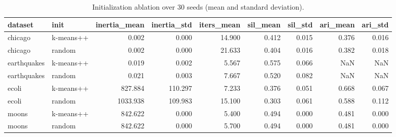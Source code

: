 \begin{table}[t]
\caption{Initialization ablation over 30 seeds (mean and standard deviation).}
\label{tab:init}
\begin{tabular}{llrrrrrrr}
\toprule
dataset & init & inertia\_mean & inertia\_std & iters\_mean & sil\_mean & sil\_std & ari\_mean & ari\_std \\
\midrule
chicago & k-means++ & 0.002 & 0.000 & 14.900 & 0.412 & 0.015 & 0.376 & 0.016 \\
chicago & random & 0.002 & 0.000 & 21.633 & 0.404 & 0.016 & 0.382 & 0.018 \\
earthquakes & k-means++ & 0.019 & 0.002 & 5.567 & 0.575 & 0.066 & NaN & NaN \\
earthquakes & random & 0.021 & 0.003 & 7.667 & 0.520 & 0.082 & NaN & NaN \\
ecoli & k-means++ & 827.884 & 110.297 & 7.233 & 0.376 & 0.051 & 0.668 & 0.067 \\
ecoli & random & 1033.938 & 109.983 & 15.100 & 0.303 & 0.061 & 0.588 & 0.112 \\
moons & k-means++ & 842.622 & 0.000 & 5.400 & 0.494 & 0.000 & 0.481 & 0.000 \\
moons & random & 842.622 & 0.000 & 5.700 & 0.494 & 0.000 & 0.481 & 0.000 \\
\bottomrule
\end{tabular}
\end{table}
